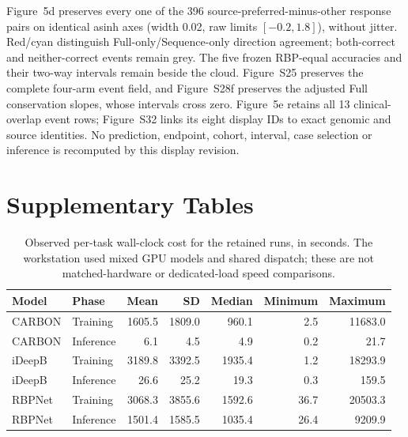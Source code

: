 \documentclass[11pt]{article}
\begin{document}
Figure~5d preserves every one of the 396 source-preferred-minus-other response pairs on identical asinh axes (width 0.02, raw limits $[-0.2,1.8]$), without jitter. Red/cyan distinguish Full-only/Sequence-only direction agreement; both-correct and neither-correct events remain grey. The five frozen RBP-equal accuracies and their two-way intervals remain beside the cloud. Figure~S25 preserves the complete four-arm event field, and Figure~S28f preserves the adjusted Full conservation slopes, whose intervals cross zero. Figure~5e retains all 13 clinical-overlap event rows; Figure~S32 links its eight display IDs to exact genomic and source identities. No prediction, endpoint, cohort, interval, case selection or inference is recomputed by this display revision.





\section{Supplementary Tables}





\begin{table}[H]
\centering
\caption{Observed per-task wall-clock cost for the retained runs, in seconds. The workstation used mixed GPU models and shared dispatch; these are not matched-hardware or dedicated-load speed comparisons.}
\label{tab:compute}
\begin{tabular}{@{}llrrrrr@{}}
\toprule
Model & Phase & Mean & SD & Median & Minimum & Maximum \\
\midrule
CARBON & Training   & 1605.5 & 1809.0 &  960.1 &     2.5 & 11683.0 \\
CARBON & Inference  &    6.1 &    4.5 &    4.9 &     0.2 &    21.7 \\
iDeepB & Training   & 3189.8 & 3392.5 & 1935.4 &     1.2 & 18293.9 \\
iDeepB & Inference  &   26.6 &   25.2 &   19.3 &     0.3 &   159.5 \\
RBPNet & Training   & 3068.3 & 3855.6 & 1592.6 &    36.7 & 20503.3 \\
RBPNet & Inference  & 1501.4 & 1585.5 & 1035.4 &    26.4 &  9209.9 \\
\bottomrule
\end{tabular}
\end{table}
\end{document}
